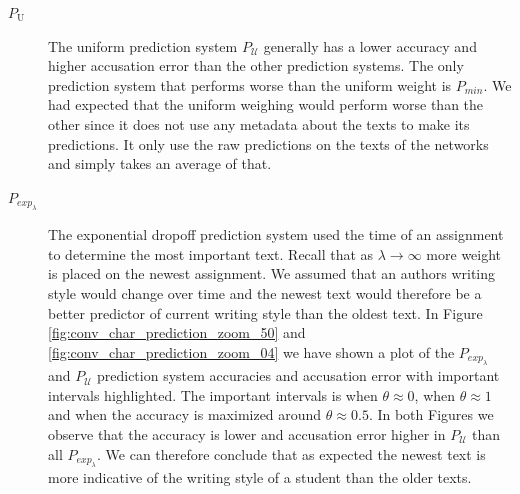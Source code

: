 \begin{description}

    \item[$P_\mathrm{U}$]

        The uniform prediction system $P_\mathcal{U}$ generally has a lower
        accuracy and higher accusation error than the other prediction systems.
        The only prediction system that performs worse than the uniform weight
        is $P_{min}$. We had expected that the uniform weighing would perform
        worse than the other since it does not use any metadata about the texts
        to make its predictions. It only use the raw predictions on the texts of
        the networks and simply takes an average of that.

    \item[$P_{exp_\lambda}$]

        The exponential dropoff prediction system used the time of an
        assignment to determine the most important text. Recall that
        as $\lambda \rightarrow \infty$ more weight is placed on the
        newest assignment. We assumed that an authors writing style
        would change over time and the newest text would therefore be
        a better predictor of current writing style than the oldest
        text. In Figure \ref{fig:conv_char_prediction_zoom_50} and
        \ref{fig:conv_char_prediction_zoom_04} we have shown a plot of the
        $P_{exp_\lambda}$ and $P_\mathcal{U}$ prediction system accuracies and
        accusation error with important intervals highlighted. The important
        intervals is when $\theta \approx 0$, when $\theta \approx 1$ and when
        the accuracy is maximized around $\theta \approx 0.5$. In both Figures
        we observe that the accuracy is lower and accusation error higher in
        $P_\mathcal{U}$ than all $P_{exp_\lambda}$. We can therefore conclude
        that as expected the newest text is more indicative of the writing style
        of a student than the older texts.


\end{description}
